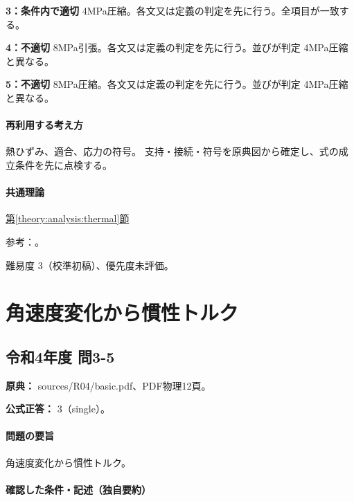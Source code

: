 \noindent\textbf{3：条件内で適切} 4MPa圧縮。各文又は定義の判定を先に行う。全項目が一致する。\par

\noindent\textbf{4：不適切} 8MPa引張。各文又は定義の判定を先に行う。並びが判定 4MPa圧縮 と異なる。\par

\noindent\textbf{5：不適切} 8MPa圧縮。各文又は定義の判定を先に行う。並びが判定 4MPa圧縮 と異なる。\par

\paragraph{再利用する考え方} 熱ひずみ、適合、応力の符号。 支持・接続・符号を原典図から確定し、式の成立条件を先に点検する。

\paragraph{共通理論} \hyperref[theory:analysis:thermal]{第\ref*{theory:analysis:thermal}節}

\par 参考：\cite{mit_material_elastic2000}。

\par 難易度 3（校準初稿）、優先度未評価。

\section{角速度変化から慣性トルク}

\subsection{令和4年度 問3-5}
\label{q:r04-reg-basic-3-5}

\noindent\textbf{原典：} sources/R04/basic.pdf、PDF物理12頁。

\textbf{公式正答：} 3（single）。

\paragraph{問題の要旨} 角速度変化から慣性トルク。

\paragraph{確認した条件・記述（独自要約）}\mbox{}\par

